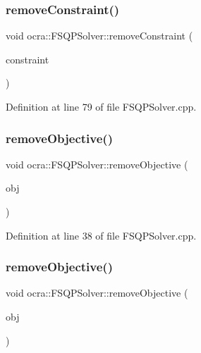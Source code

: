 \subsubsection{\texorpdfstring{remove\+Constraint()}{removeConstraint()}\hspace{0.1cm}{\footnotesize\ttfamily [2/2]}}
{\footnotesize\ttfamily void ocra\+::\+F\+S\+Q\+P\+Solver\+::remove\+Constraint (\begin{DoxyParamCaption}\item[{\hyperlink{namespaceocra_af10341108ce661566aad00908668e2b1}{Generic\+Constraint} \&}]{constraint }\end{DoxyParamCaption})}



Definition at line 79 of file F\+S\+Q\+P\+Solver.\+cpp.

\hypertarget{classocra_1_1FSQPSolver_a4c49fc6031becd57ed9710ecb7f4d3f8}{}\label{classocra_1_1FSQPSolver_a4c49fc6031becd57ed9710ecb7f4d3f8} 
\subsubsection{\texorpdfstring{remove\+Objective()}{removeObjective()}\hspace{0.1cm}{\footnotesize\ttfamily [1/2]}}
{\footnotesize\ttfamily void ocra\+::\+F\+S\+Q\+P\+Solver\+::remove\+Objective (\begin{DoxyParamCaption}\item[{\hyperlink{classocra_1_1Function}{Function} \&}]{obj }\end{DoxyParamCaption})}



Definition at line 38 of file F\+S\+Q\+P\+Solver.\+cpp.

\hypertarget{classocra_1_1FSQPSolver_aeb5031b31d2b3f9a303f234aa8418754}{}\label{classocra_1_1FSQPSolver_aeb5031b31d2b3f9a303f234aa8418754} 
\subsubsection{\texorpdfstring{remove\+Objective()}{removeObjective()}\hspace{0.1cm}{\footnotesize\ttfamily [2/2]}}
{\footnotesize\ttfamily void ocra\+::\+F\+S\+Q\+P\+Solver\+::remove\+Objective (\begin{DoxyParamCaption}\item[{\hyperlink{namespaceocra_a37a91885f4fa5c523d22cb15d5673062}{Generic\+Objective} \&}]{obj }\end{DoxyParamCaption})}



